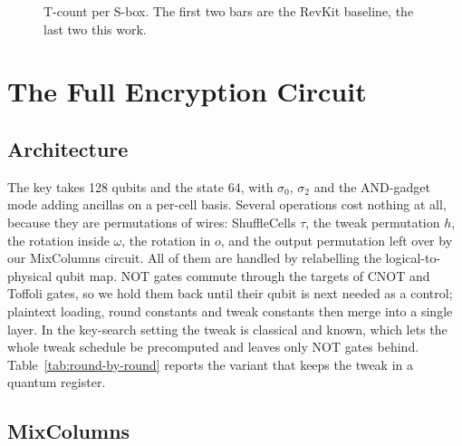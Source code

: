 \documentclass[runningheads,10pt]{llncs}
\begin{document}
\begin{figure}[htbp]
\centering
{}
\caption{T-count per S-box. The first two bars are the RevKit baseline, the last two this work.}
\label{fig:tcount-per-sbox}
\end{figure}

\section{The Full Encryption Circuit}
\label{sec:full-circuit}

\subsection{Architecture}

The key takes 128 qubits and the state 64, with $\sigma_0$, $\sigma_2$ and the AND-gadget mode adding ancillas on a per-cell basis. Several operations cost nothing at all, because they are permutations of wires: ShuffleCells $\tau$, the tweak permutation $h$, the rotation inside $\omega$, the rotation in $o$, and the output permutation left over by our MixColumns circuit. All of them are handled by relabelling the logical-to-physical qubit map. NOT gates commute through the targets of CNOT and Toffoli gates, so we hold them back until their qubit is next needed as a control; plaintext loading, round constants and tweak constants then merge into a single layer. In the key-search setting the tweak is classical and known, which lets the whole tweak schedule be precomputed and leaves only NOT gates behind. Table~\ref{tab:round-by-round} reports the variant that keeps the tweak in a quantum register.

\subsection{MixColumns}
\end{document}
